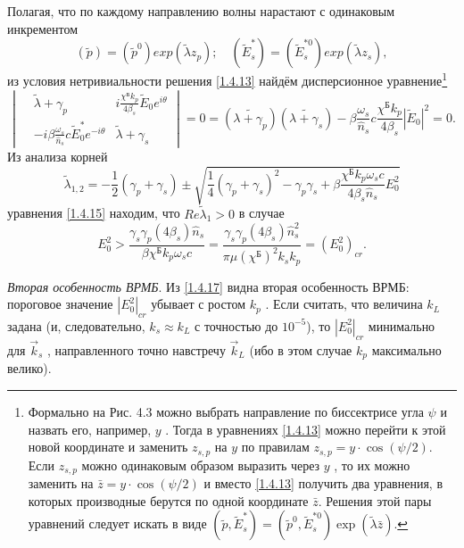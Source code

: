 \documentclass[a4paper]{article}
\begin{document}
Полагая, что по каждому направлению волны нарастают с одинаковым инкрементом 
\begin{equation}
	(\tilde{p})=(\tilde{p}^{0})exp(\tilde{\lambda}z_{p});\quad	(\tilde{E}_{s}^{*})=(\tilde{E}_{s}^{*0})exp(\tilde{\lambda}z_{s}),
	\label{1.4.14}
\end{equation}
из условия нетривиальности решения \eqref{1.4.13} найдём дисперсионное уравнение\footnote{Формально на Рис. 4.3 можно выбрать направление по биссектрисе угла $\psi$  и назвать его, например, $y$ . Тогда в уравнениях \eqref{1.4.13} можно перейти к этой новой координате и заменить $z_{s,p}$  на $y$  по правилам $z_{s,p}=y\cdot\cos(\psi/2)$. Если $z_{s,p}$  можно одинаковым образом выразить через $y$ , то их можно заменить на $\bar{z}=y\cdot\cos(\psi/2)$  и вместо \eqref{1.4.13} получить два уравнения, в которых производные берутся по одной координате $\bar{z}$. Решения этой пары уравнений следует искать в виде $(\tilde{p},\tilde{E}_{s}^{*})=(\tilde{p}^{0},\tilde{E}_{s}^{*0})\exp(\tilde{\lambda}\bar{z})$.} 
\begin{equation}
	\begin{vmatrix}
		&\tilde{\lambda}+\gamma_{p}  &i\frac{\chi^{\text{Б}}k_{p}}{4\beta_{s}}\tilde{E}_{0}e^{i\theta}\\
		&-i\beta\frac{\omega_{s}}{\hat{n}_{s}}c\tilde{E}_{0}^{*}e^{-i\theta}  &\tilde{\lambda}+\gamma_{s}
	\end{vmatrix}=0=\left(\tilde{\lambda+\gamma_{p}}\right)\left(\tilde{\lambda+\gamma_{s}}\right)-\beta\frac{\omega_{s}}{\hat{n}_{s}}c\frac{\chi^{\text{Б}}k_{p}}{4\beta_{s}}\left|\tilde{E}_{0}\right|^{2}=0.
	\label{1.4.15}
\end{equation}
Из анализа корней 
\begin{equation}
	\tilde{\lambda}_{1,2}=-\frac{1}{2}(\gamma_{p}+\gamma_{s})\pm\sqrt{\frac{1}{4}(\gamma_{p}+\gamma_{s})^{2}-\gamma_{p}\gamma_{s}+\beta\frac{\chi^{\text{Б}}k_{p}\omega_{s}c}{4\beta_{s}\hat{n}_{s}}E_{0}^{2}}
	\label{1.4.16}
\end{equation}
уравнения \eqref{1.4.15} находим, что $Re\tilde{\lambda}_{1}>0$ в случае 
\begin{equation}
	E_{0}^{2}>\frac{\gamma_{s}\gamma_{p}(4\beta_{s})\hat{n}_{s}}{\beta\chi^{\text{Б}}k_{p}\omega_{s}c}=\frac{\gamma_{s}\gamma_{p}(4\beta_{s})\hat{n}_{s}^{2}}{\pi\mu(\chi^{\text{Б}})^{2}k_{s}k_{p}}=(E_{0}^{2})_{cr}.
	\label{1.4.17}
\end{equation}

\textit{Вторая особенность ВРМБ}. Из \eqref{1.4.17} видна вторая особенность ВРМБ: пороговое значение  $\left|E_{0}^{2}\right|_{cr}$  убывает с ростом $k_{p}$ . Если считать, что величина $k_{L}$  задана (и, следовательно, $k_{s}\approx k_{L}$  с точностью до $10^{-5}$), то $\left|E_{0}^{2}\right|_{cr}$ минимально для $\vec{k}_{s}$ , направленного точно навстречу $\vec{k}_{L}$  (ибо в этом случае $k_{p}$ максимально велико). 
\end{document}
